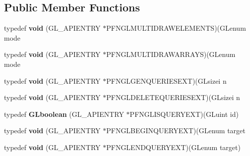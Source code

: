\subsection*{Public Member Functions}
\begin{DoxyCompactItemize}
\item 
\hypertarget{class_c_p_v_r_tgles2_ext_af94a52689d2dd162575afb6786f40b19}{typedef {\bfseries void} (G\+L\+\_\+\+A\+P\+I\+E\+N\+T\+R\+Y $\ast$P\+F\+N\+G\+L\+M\+U\+L\+T\+I\+D\+R\+A\+W\+E\+L\+E\+M\+E\+N\+T\+S)(G\+Lenum mode}\label{class_c_p_v_r_tgles2_ext_af94a52689d2dd162575afb6786f40b19}

\item 
\hypertarget{class_c_p_v_r_tgles2_ext_ad5a9913a3fb3df336f179d674174365b}{typedef {\bfseries void} (G\+L\+\_\+\+A\+P\+I\+E\+N\+T\+R\+Y $\ast$P\+F\+N\+G\+L\+M\+U\+L\+T\+I\+D\+R\+A\+W\+A\+R\+R\+A\+Y\+S)(G\+Lenum mode}\label{class_c_p_v_r_tgles2_ext_ad5a9913a3fb3df336f179d674174365b}

\item 
\hypertarget{class_c_p_v_r_tgles2_ext_a15bfc778fbf3b47d7a6bf90f2bde5a9b}{typedef {\bfseries void} (G\+L\+\_\+\+A\+P\+I\+E\+N\+T\+R\+Y $\ast$P\+F\+N\+G\+L\+G\+E\+N\+Q\+U\+E\+R\+I\+E\+S\+E\+X\+T)(G\+Lsizei n}\label{class_c_p_v_r_tgles2_ext_a15bfc778fbf3b47d7a6bf90f2bde5a9b}

\item 
\hypertarget{class_c_p_v_r_tgles2_ext_ae1f47569223f26e631591b100e56bb0a}{typedef {\bfseries void} (G\+L\+\_\+\+A\+P\+I\+E\+N\+T\+R\+Y $\ast$P\+F\+N\+G\+L\+D\+E\+L\+E\+T\+E\+Q\+U\+E\+R\+I\+E\+S\+E\+X\+T)(G\+Lsizei n}\label{class_c_p_v_r_tgles2_ext_ae1f47569223f26e631591b100e56bb0a}

\item 
\hypertarget{class_c_p_v_r_tgles2_ext_a76c0fc00498eed98f1851256d8d4e533}{typedef {\bfseries G\+Lboolean} (G\+L\+\_\+\+A\+P\+I\+E\+N\+T\+R\+Y $\ast$P\+F\+N\+G\+L\+I\+S\+Q\+U\+E\+R\+Y\+E\+X\+T)(G\+Luint id)}\label{class_c_p_v_r_tgles2_ext_a76c0fc00498eed98f1851256d8d4e533}

\item 
\hypertarget{class_c_p_v_r_tgles2_ext_a48426169cd108d7743e46adee167bb7d}{typedef {\bfseries void} (G\+L\+\_\+\+A\+P\+I\+E\+N\+T\+R\+Y $\ast$P\+F\+N\+G\+L\+B\+E\+G\+I\+N\+Q\+U\+E\+R\+Y\+E\+X\+T)(G\+Lenum target}\label{class_c_p_v_r_tgles2_ext_a48426169cd108d7743e46adee167bb7d}

\item 
\hypertarget{class_c_p_v_r_tgles2_ext_a3ba113e2efadee0ab21d56cf6516119a}{typedef {\bfseries void} (G\+L\+\_\+\+A\+P\+I\+E\+N\+T\+R\+Y $\ast$P\+F\+N\+G\+L\+E\+N\+D\+Q\+U\+E\+R\+Y\+E\+X\+T)(G\+Lenum target)}\label{class_c_p_v_r_tgles2_ext_a3ba113e2efadee0ab21d56cf6516119a}


\end{DoxyCompactItemize}

